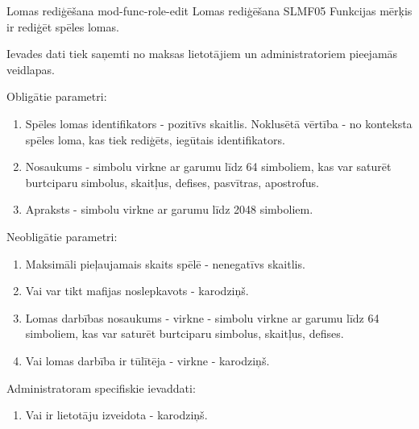 \moduleFunctionTable
{Lomas rediģēšana}
{mod-func-role-edit}
{Lomas rediģēšana}
{SLMF05}
{
	Funkcijas mērķis ir rediģēt spēles lomas.
}
{
	Ievades dati tiek saņemti no maksas lietotājiem un administratoriem pieejamās veidlapas.

	Obligātie parametri:
	\begin{enumerate}
		\item Spēles lomas identifikators - pozitīvs skaitlis. Noklusētā vērtība - no konteksta spēles loma, kas tiek rediģēts, iegūtais identifikators.
		\item Nosaukums - simbolu virkne ar garumu līdz 64 simboliem, kas var saturēt burtciparu simbolus, skaitļus, defises, pasvītras, apostrofus.
		\item Apraksts - simbolu virkne ar garumu līdz 2048 simboliem.
	\end{enumerate}

	Neobligātie parametri:
	\begin{enumerate}
		\item Maksimāli pieļaujamais skaits spēlē - nenegatīvs skaitlis.
		\item Vai var tikt mafijas noslepkavots - karodziņš.
		\item Lomas darbības nosaukums - virkne -  simbolu virkne ar garumu līdz 64 simboliem, kas var saturēt burtciparu simbolus, skaitļus, defises.
		\item Vai lomas darbība ir tūlītēja - virkne - karodziņš.
	\end{enumerate}

	Administratoram specifiskie ievaddati:
	\begin{enumerate}
		\item Vai ir lietotāju izveidota - karodziņš.
	\end{enumerate}
}
